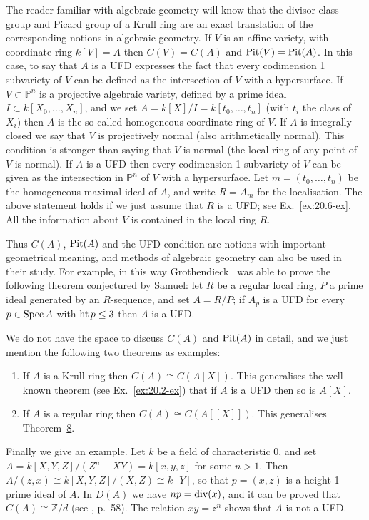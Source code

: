 The reader familiar with algebraic geometry will know that the divisor
class group and Picard group of a Krull ring are an exact translation of
the corresponding notions in algebraic geometry. If $V$ is an affine variety,
with coordinate ring $k[V] = A$ then $C(V) = C(A)$ and $\operatorname{Pit}(V) = \operatorname{Pit}(A)$. In
this case, to say that $A$ is a UFD expresses the fact that every codimension
1 subvariety of $V$ can be defined as the intersection of $V$ with a hypersurface.
If $V \subset \mathbb{P}^n$ is a projective algebraic variety, defined by a prime ideal
$I \subset k[X_0, \ldots, X_n]$, and we set $A = k[X]/I = k[t_0, \ldots, t_n]$ (with $t_i$ the
class of $X_i$) then $A$ is the so-called homogeneous coordinate ring of $V$. If
$A$ is integrally closed we say that $V$ is projectively normal (also
arithmetically normal). This condition is stronger than saying that $V$ is
normal (the local ring of any point of $V$ is normal). If $A$ is a UFD then
every codimension 1 subvariety of $V$ can be given as the intersection in
$\mathbb{P}^n$ of $V$ with a hypersurface. Let $m = (t_0, \ldots, t_n)$ be the homogeneous
maximal ideal of $A$, and write $R = A_m$ for the localisation. The above
statement holds if we just assume that $R$ is a UFD; see Ex.~\ref{ex:20.6-ex}. All the
information about $V$ is contained in the local ring $R$.

Thus $C(A)$, $\operatorname{Pit}(A)$ and the UFD condition are notions with important
geometrical meaning, and methods of algebraic geometry can also be used
in their study. For example, in this way Grothendieck~\cite{G5} was able to
prove the following theorem conjectured by Samuel: let $R$ be a regular
local ring, $P$ a prime ideal generated by an $R$-sequence, and set $A = R/P$;
if $A_p$ is a UFD for every $p \in \operatorname{Spec} A$ with $\operatorname{ht} p \le 3$ then $A$ is a UFD.

We do not have the space to discuss $C(A)$ and $\operatorname{Pit}(A)$ in detail, and we
just mention the following two theorems as examples:
\begin{enumerate}[(1)]
  \item If $A$ is a Krull ring then $C(A) \cong C(A[X])$.
        This generalises the well-known theorem (see Ex.~\ref{ex:20.2-ex}) that if $A$ is a UFD
        then so is $A[X]$.
  \item If $A$ is a regular ring then $C(A) \cong C(A[[X]])$.
        This generalises Theorem~\hyperref[thm:20.8]{8}.
\end{enumerate}
Finally we give an example. Let $k$ be a field of characteristic 0, and set
$A = k[X, Y, Z]/(Z^n - XY) = k[x, y, z]$ for some $n > 1$. Then $A/(z, x) \cong
k[X, Y, Z]/(X, Z) \cong k[Y]$, so that $p = (x, z)$ is a height 1 prime ideal of $A$.
In $D(A)$ we have $np = \operatorname{div}(x)$, and it can be proved that $C(A) \cong \mathbb{Z}/d$ (see
\cite{S2}, p.~58). The relation $xy = z^n$ shows that $A$ is not a UFD.

